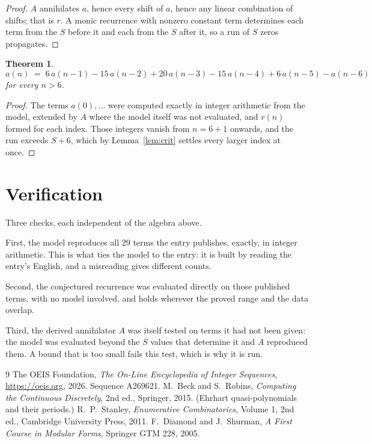 \documentclass[11pt,a4paper]{article}
\theoremstyle{plain}
\newtheorem{theorem}{Theorem}
\theoremstyle{definition}
\begin{document}
\begin{proof}
$A$ annihilates $a$, hence every shift of $a$, hence any linear combination of shifts; that is
$r$. A monic recurrence with nonzero constant term determines each term from the $S$ before it
and each from the $S$ after it, so a run of $S$ zeros propagates.
\end{proof}

\begin{theorem}
\[
a(n)\;=\;6\,a(n-1) - 15\,a(n-2) + 20\,a(n-3) - 15\,a(n-4) + 6\,a(n-5) - a(n-6)
\]
for every $n>6$.
\end{theorem}

\begin{proof}
The terms $a(0),\dots$ were computed exactly in integer arithmetic from the model, extended by
$A$ where the model itself was not evaluated, and $r(n)$ formed for each index. Those integers
vanish from $n=6+1$ onwards, and the run exceeds $S+6$, which by
Lemma~\ref{lem:crit} settles every larger index at once.
\end{proof}

\section{Verification}

Three checks, each independent of the algebra above.

First, the model reproduces all $29$ terms the entry publishes, exactly, in integer
arithmetic. This is what ties the model to the entry: it is built by reading the entry's
English, and a misreading gives different counts.

Second, the conjectured recurrence was evaluated directly on those published terms, with no
model involved, and holds wherever the proved range and the data overlap.

Third, the derived annihilator $A$ was itself tested on terms it had not been given: the model
was evaluated beyond the $S$ values that determine it and $A$ reproduced them. A bound that is
too small fails this test, which is why it is run.

\begin{thebibliography}{9}
 The OEIS Foundation, \emph{The On-Line Encyclopedia of Integer
Sequences}, \url{https://oeis.org}, 2026. Sequence A269621.
 M.~Beck and S.~Robins, \emph{Computing the Continuous Discretely},
2nd ed., Springer, 2015. (Ehrhart quasi-polynomials and their periods.)
 R.~P.~Stanley, \emph{Enumerative Combinatorics}, Volume 1, 2nd ed.,
Cambridge University Press, 2011.
 F.~Diamond and J.~Shurman, \emph{A First Course in Modular Forms},
Springer GTM 228, 2005.
\end{thebibliography}
\end{document}
